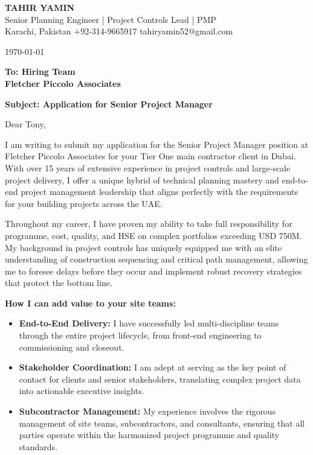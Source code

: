 \documentclass[11pt,a4paper]{article}
\begin{document}
\begin{center}
    {\Huge \textbf{\color{awesome-darknight} TAHIR YAMIN}} \\[0.2cm]
    {\Large \color{awesome-gray} Senior Planning Engineer | Project Controls Lead | PMP} \\[0.3cm]
    
    \small \color{light-gray}
    Karachi, Pakistan \quad \textbullet \quad 
    +92-314-9665917 \quad \textbullet \quad 
    tahiryamin52@gmail.com
\end{center}

\vspace{0.8cm}
\today
\vspace{0.5cm}

\textbf{To: Hiring Team} \\
\textbf{Fletcher Piccolo Associates} \\
\vspace{0.5cm}

\textbf{Subject: Application for Senior Project Manager}

\vspace{0.5cm}

Dear Tony,

I am writing to submit my application for the Senior Project Manager position at Fletcher Piccolo Associates for your Tier One main contractor client in Dubai. With over 15 years of extensive experience in project controls and large-scale project delivery, I offer a unique hybrid of technical planning mastery and end-to-end project management leadership that aligns perfectly with the requirements for your building projects across the UAE.

Throughout my career, I have proven my ability to take full responsibility for programme, cost, quality, and HSE on complex portfolios exceeding USD 750M. My background in project controls has uniquely equipped me with an elite understanding of construction sequencing and critical path management, allowing me to foresee delays before they occur and implement robust recovery strategies that protect the bottom line.

\textbf{How I can add value to your site teams:}
\begin{itemize}
    \item \textbf{End-to-End Delivery:} I have successfully led multi-discipline teams through the entire project lifecycle, from front-end engineering to commissioning and closeout.
    \item \textbf{Stakeholder Coordination:} I am adept at serving as the key point of contact for clients and senior stakeholders, translating complex project data into actionable executive insights.
    \item \textbf{Subcontractor Management:} My experience involves the rigorous management of site teams, subcontractors, and consultants, ensuring that all parties operate within the harmonized project programme and quality standards.
\end{itemize}
\end{document}
